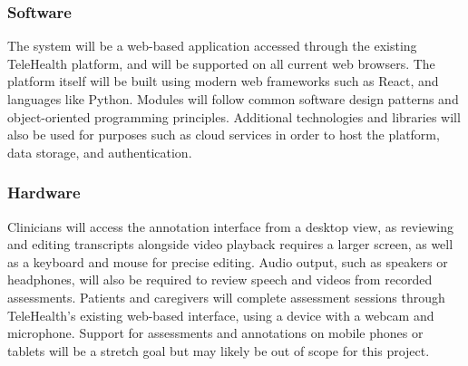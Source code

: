 \documentclass{article}
\begin{document}
\subsubsection{Software}
The system will be a web-based application accessed through the existing TeleHealth
platform, and will be supported on all current web browsers. The platform itself will
be built using modern web frameworks such as React, and languages like Python.
Modules will follow common software design patterns and object-oriented programming
principles. Additional technologies and libraries will also be used for purposes such
as cloud services in order to host the platform, data storage, and authentication.

\subsubsection{Hardware}
Clinicians will access the annotation interface from a desktop view,
as reviewing and editing transcripts alongside video playback requires a larger
screen, as well as a keyboard and mouse for precise editing. Audio output, such as
speakers or headphones, will also be required to review speech and videos
from recorded assessments. Patients and caregivers will complete assessment
sessions through TeleHealth's existing web-based interface, using a device with a 
webcam and microphone. Support for assessments and annotations on mobile phones
or tablets will be a stretch goal but may likely be out of scope for this project.
\end{document}
